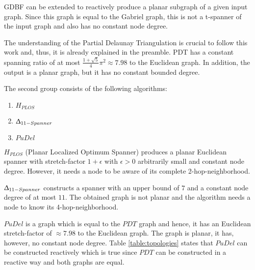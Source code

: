 GDBF can be extended to reactively produce a planar subgraph of a given input graph. 
Since this graph is equal to the Gabriel graph, this is not a t-spanner of the input graph and also has no constant node degree.

The understanding of the Partial Delaunay Triangulation is crucial to follow this work and, thus, it is already explained in the preamble.
PDT has a constant spanning ratio of at most $\frac{1+\sqrt{5}}{4}\pi^2 \approx 7.98 $ to the Euclidean graph.
In addition, the output is a planar graph, but it has no constant bounded degree.


The second group consists of the following algorithms:
\begin{enumerate}
\item $H_{PLOS} $
\item $\Updelta _{11-Spanner} $
\item $PuDel $
\end{enumerate}

$H_{PLOS} $ (Planar Localized Optimum Spanner)\cite{Damian2010} produces a planar Euclidean spanner with stretch-factor $1+ \epsilon $ with $\epsilon >0 $ arbitrarily small and constant node degree.
However, it needs a node to be aware of its complete 2-hop-neighborhood.

$\Updelta _{11-Spanner} $ \cite{Kanj2012} constructs a spanner with an upper bound of $7 $ and a constant node degree of at most $11 $.
The obtained graph is not planar and the algorithm needs a node to know its 4-hop-neighborhood.

$PuDel $ \cite{Xu2011} is a graph which is equal to the $PDT $ graph \cite{Neumann2012} and hence, it has an Euclidean stretch-factor of $\approx 7.98 $ to the Euclidean graph.
The graph is planar, it has, however, no constant node degree. 
Table \ref{table:topologies} states that $PuDel $ can be constructed reactively which is true since $PDT $ can be constructed in a reactive way and both graphs are equal.






